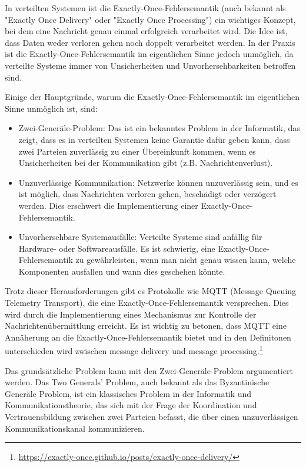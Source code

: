 In verteilten Systemen ist die Exactly-Once-Fehlersemantik (auch bekannt als "Exactly Once Delivery" oder "Exactly Once Processing") ein wichtiges Konzept, bei dem eine Nachricht genau einmal erfolgreich verarbeitet wird. Die Idee ist, dass Daten weder verloren gehen noch doppelt verarbeitet werden. In der Praxis ist die Exactly-Once-Fehlersemantik im eigentlichen Sinne jedoch unmöglich, da verteilte Systeme immer von Unsicherheiten und Unvorhersehbarkeiten betroffen sind.

Einige der Hauptgründe, warum die Exactly-Once-Fehlersemantik im eigentlichen Sinne unmöglich ist, sind:
\begin{itemize}
\item Zwei-Generäle-Problem: Das ist ein bekanntes Problem in der Informatik, das zeigt, dass es in verteilten Systemen keine Garantie dafür geben kann, dass zwei Parteien zuverlässig zu einer Übereinkunft kommen, wenn es Unsicherheiten bei der Kommunikation gibt (z.B. Nachrichtenverlust).
\item Unzuverlässige Kommunikation: Netzwerke können unzuverlässig sein, und es ist möglich, dass Nachrichten verloren gehen, beschädigt oder verzögert werden. Dies erschwert die Implementierung einer Exactly-Once-Fehlersemantik.
\item Unvorhersehbare Systemausfälle: Verteilte Systeme sind anfällig für Hardware- oder Softwareausfälle. Es ist schwierig, eine Exactly-Once-Fehlersemantik zu gewährleisten, wenn man nicht genau wissen kann, welche Komponenten ausfallen und wann dies geschehen könnte.
\end{itemize}
Trotz dieser Herausforderungen gibt es Protokolle wie MQTT (Message Queuing Telemetry Transport), die eine Exactly-Once-Fehlersemantik versprechen. Dies wird durch die Implementierung eines Mechanismus zur Kontrolle der Nachrichtenübermittlung erreicht. Es ist wichtig zu betonen, dass MQTT eine Annäherung an die Exactly-Once-Fehlersemantik bietet und in den Definitonen unterschieden wird zwischen  message delivery und message processing.\footnote{\url{https://exactly-once.github.io/posts/exactly-once-delivery/}}

Das grundsätzliche Problem kann mit den Zwei-Generäle-Problem argumentiert werden. Das Two Generals' Problem, auch bekannt als das Byzantinische Generäle Problem, ist ein klassisches Problem in der Informatik und Kommunikationstheorie, das sich mit der Frage der Koordination und Vertrauensbildung zwischen zwei Parteien befasst, die über einen unzuverlässigen Kommunikationskanal kommunizieren.

